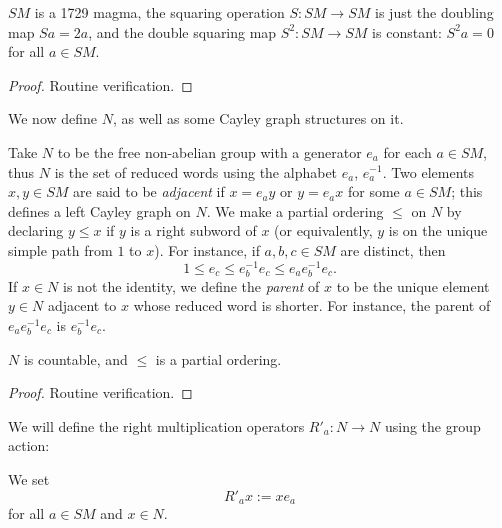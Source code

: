 \begin{lemma}\label{sm-1729}\leanok $SM$ is a 1729 magma, the squaring operation $S: SM \to SM$ is just the doubling map $Sa = 2a$, and the double squaring map $S^2: SM \to SM$ is constant: $S^2 a = 0$ for all $a \in SM$.
\end{lemma}

\begin{proof}\leanok Routine verification.
\end{proof}

We now define $N$, as well as some Cayley graph structures on it.

\begin{definition}[Definition of $N$]\label{n-def}\leanok Take $N$ to be the free non-abelian group with a generator $e_a$ for each $a \in SM$, thus $N$ is the set of reduced words using the alphabet $e_a$, $e_a^{-1}$.  Two elements $x,y \in SM$ are said to be \emph{adjacent} if $x = e_a y$ or $y = e_a x$ for some $a \in SM$; this defines a left Cayley graph on $N$.  We make a partial ordering $\leq$ on $N$ by declaring $y \leq x$ if $y$ is a right subword of $x$ (or equivalently, $y$ is on the unique simple path from $1$ to $x$).  For instance, if $a,b,c \in SM$ are distinct, then
  $$ 1 \leq e_c \leq e_b^{-1} e_c \leq e_a e_b^{-1} e_c.$$
If $x \in N$ is not the identity, we define the \emph{parent} of $x$ to be the unique element $y \in N$ adjacent to $x$ whose reduced word is shorter.  For instance, the parent of $e_a e_b^{-1} e_c$ is $e_b^{-1} e_c$.
\end{definition}

\begin{lemma}\label{n-prop}\leanok  $N$ is countable, and $\leq$ is a partial ordering.
\end{lemma}

\begin{proof} Routine verification.
\end{proof}

We will define the right multiplication operators $R'_a: N \to N$ using the group action:

\begin{definition}[Definition of $R'_a$]\label{ra-defn}\leanok We set
  \begin{equation}\label{ra-def}
    R'_a x := x e_a
  \end{equation}
  for all $a \in SM$ and $x \in N$.
\end{definition}

